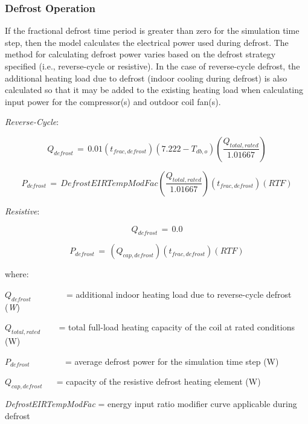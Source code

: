 \subsubsection{Defrost Operation}\label{defrost-operation}

If the fractional defrost time period is greater than zero for the simulation time step, then the model calculates the electrical power used during defrost. The method for calculating defrost power varies based on the defrost strategy specified (i.e., reverse-cycle or resistive). In the case of reverse-cycle defrost, the additional heating load due to defrost (indoor cooling during defrost) is also calculated so that it may be added to the existing heating load when calculating input power for the compressor(s) and outdoor coil fan(s).

\emph{Reverse-Cycle}:

\begin{equation}
{Q_{defrost}}\, = \,0.01\left( {{t_{frac,defrost}}} \right)\left( {7.222 - {T_{db,o}}} \right)\left( {\frac{{{Q_{total,rated}}}}{{1.01667}}} \right)
\end{equation}

\begin{equation}
{P_{defrost}}\, = \,DefrostEIRTempModFac\left( {\frac{{{Q_{total,rated}}}}{{1.01667}}} \right)\left( {{t_{frac,defrost}}} \right)\left( {RTF} \right)
\end{equation}

\emph{Resistive}:

\begin{equation}
{Q_{defrost}}\, = \,0.0
\end{equation}

\begin{equation}
{P_{defrost}}\, = \,\left( {{Q_{cap,defrost}}} \right)\left( {{t_{frac,defrost}}} \right)\left( {RTF} \right)
\end{equation}

where:

\({Q_{defrost}}\) ~~~~~~~ = additional indoor heating load due to reverse-cycle defrost (\emph{W})

\({Q_{total,rated}}\) ~~~ = total full-load heating capacity of the coil at rated conditions (W)

\({P_{defrost}}\) ~~~~~~~ = average defrost power for the simulation time step (W)

\({Q_{cap,defrost}}\) ~~ = capacity of the resistive defrost heating element (W)

\emph{DefrostEIRTempModFac} = energy input ratio modifier curve applicable during defrost

